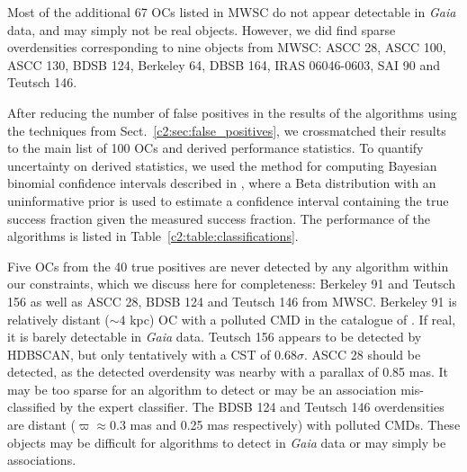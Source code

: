 Most of the additional 67 OCs listed in MWSC do not appear detectable in \emph{Gaia} data, and may simply not be real objects. However, we did find sparse overdensities corresponding to nine objects from MWSC: ASCC 28, ASCC 100, ASCC 130, BDSB 124, Berkeley 64, DBSB 164, IRAS 06046-0603, SAI 90 and Teutsch 146. 

After reducing the number of false positives in the results of the algorithms using the techniques from Sect.~\ref{c2:sec:false_positives}, we crossmatched their results to the main list of 100 OCs and derived performance statistics. To quantify uncertainty on derived statistics, we used the method for computing Bayesian binomial confidence intervals described in \cite{cameron_estimation_2011}, where a Beta distribution with an uninformative prior is used to estimate a confidence interval containing the true success fraction given the measured success fraction. The performance of the algorithms is listed in Table~\ref{c2:table:classifications}. 

Five OCs from the 40 true positives are never detected by any algorithm within our constraints, which we discuss here for completeness: Berkeley 91 and Teutsch 156 \citep[objects from][]{cantat-gaudin_clusters_2020} as well as ASCC 28, BDSB 124 and Teutsch 146 from MWSC. Berkeley 91 is relatively distant ($\sim4$ kpc) OC with a polluted CMD in the catalogue of \cite{cantat-gaudin_clusters_2020}. If real, it is barely detectable in \emph{Gaia} data. Teutsch 156 appears to be detected by HDBSCAN, but only tentatively with a CST of 0.68$\sigma$. ASCC 28 should be detected, as the detected overdensity was nearby with a parallax of 0.85 mas. It may be too sparse for an algorithm to detect or may be an association mis-classified by the expert classifier. The BDSB 124 and Teutsch 146 overdensities are distant ($\varpi \approx 0.3$ mas and 0.25 mas respectively) with polluted CMDs. These objects may be difficult for algorithms to detect in \emph{Gaia} data or may simply be associations.


